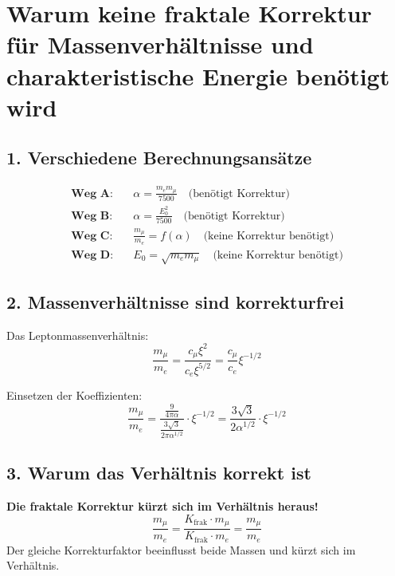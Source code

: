 \documentclass[12pt,a4paper]{article}
\begin{document}

\section{Warum keine fraktale Korrektur für Massenverhältnisse und charakteristische Energie benötigt wird}

\subsection{1. Verschiedene Berechnungsansätze}

\begin{align*}
	\textbf{Weg A:} &\quad \alpha = \frac{m_e m_\mu}{7500} \quad \text{(benötigt Korrektur)} \\
	\textbf{Weg B:} &\quad \alpha = \frac{E_0^2}{7500} \quad \text{(benötigt Korrektur)} \\
	\textbf{Weg C:} &\quad \frac{m_\mu}{m_e} = f(\alpha) \quad \text{(keine Korrektur benötigt)} \\
	\textbf{Weg D:} &\quad E_0 = \sqrt{m_e m_\mu} \quad \text{(keine Korrektur benötigt)}
\end{align*}

\subsection{2. Massenverhältnisse sind korrekturfrei}

Das Leptonmassenverhältnis:
\[
\frac{m_\mu}{m_e} = \frac{c_\mu \xi^2}{c_e \xi^{5/2}} = \frac{c_\mu}{c_e} \xi^{-1/2}
\]

Einsetzen der Koeffizienten:
\[
\frac{m_\mu}{m_e} = \frac{\frac{9}{4\pi\alpha}}{\frac{3\sqrt{3}}{2\pi\alpha^{1/2}}} \cdot \xi^{-1/2} = \frac{3\sqrt{3}}{2\alpha^{1/2}} \cdot \xi^{-1/2}
\]

\subsection{3. Warum das Verhältnis korrekt ist}

\begin{tcolorbox}[colback=green!5!white,colframe=green!75!black]
	\textbf{Die fraktale Korrektur kürzt sich im Verhältnis heraus!}
	\[
	\frac{m_\mu}{m_e} = \frac{K_{\text{frak}} \cdot m_\mu}{K_{\text{frak}} \cdot m_e} = \frac{m_\mu}{m_e}
	\]
	Der gleiche Korrekturfaktor beeinflusst beide Massen und kürzt sich im Verhältnis.
\end{tcolorbox}
\end{document}

